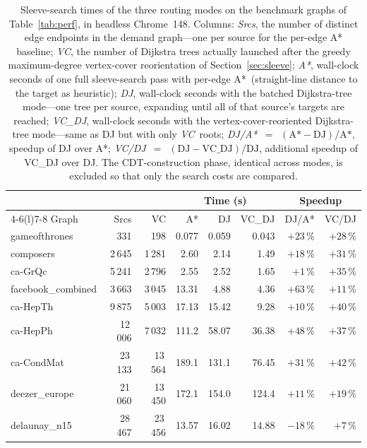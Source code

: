 \begin{table}[t]
  \centering
  \scriptsize
  \setlength{\tabcolsep}{4.5pt}
  \begin{tabular}{@{}lrrrrrrr@{}}
    \toprule
    & & & \multicolumn{3}{c}{Time (s)} & \multicolumn{2}{c}{Speedup} \\
    \cmidrule(lr){4-6}\cmidrule(l){7-8}
    Graph & Srcs & VC & A* & DJ & VC\_DJ & DJ/A* & VC/DJ \\
    \midrule
    gameofthrones      &     331 &     198 &   0.077 &   0.059 &   0.043 & $+23$\,\% & $+28$\,\% \\
    composers          &  2\,645 &  1\,281 &   2.60  &   2.14  &   1.49  & $+18$\,\% & $+31$\,\% \\
    ca-GrQc            &  5\,241 &  2\,796 &   2.55  &   2.52  &   1.65  &  $+1$\,\% & $+35$\,\% \\
    facebook\_combined &  3\,663 &  3\,045 &  13.31  &   4.88  &   4.36  & $+63$\,\% & $+11$\,\% \\
    ca-HepTh           &  9\,875 &  5\,003 &  17.13  &  15.42  &   9.28  & $+10$\,\% & $+40$\,\% \\
    ca-HepPh           & 12\,006 &  7\,032 & 111.2   &  58.07  &  36.38  & $+48$\,\% & $+37$\,\% \\
    ca-CondMat         & 23\,133 & 13\,564 & 189.1   & 131.1   &  76.45  & $+31$\,\% & $+42$\,\% \\
    deezer\_europe     & 21\,060 & 13\,450 & 172.1   & 154.0   & 124.4   & $+11$\,\% & $+19$\,\% \\
    delaunay\_n15      & 28\,467 & 23\,456 &  13.57  &  16.02  &  14.88  & $-18$\,\% &  $+7$\,\% \\
    \bottomrule
  \end{tabular}
  \caption{Sleeve-search times of the three routing modes on the
    benchmark graphs of Table~\ref{tab:perf}, in headless
    Chrome~148. Columns: \emph{Srcs}, the number of distinct edge
    endpoints in the demand graph---one per source for the per-edge
    A* baseline; \emph{VC}, the number of Dijkstra trees actually
    launched after the greedy maximum-degree vertex-cover
    reorientation of Section~\ref{sec:sleeve}; \emph{A*}, wall-clock
    seconds of one full sleeve-search pass with per-edge A*\
    (straight-line distance to the target as heuristic);
    \emph{DJ}, wall-clock seconds with the batched Dijkstra-tree
    mode---one tree per source, expanding until all of that source's
    targets are reached; \emph{VC\_DJ}, wall-clock seconds with the
    vertex-cover-reoriented Dijkstra-tree mode---same as DJ but with
    only \emph{VC}~roots; \emph{DJ/A*}~$=$~$(\text{A*}-\text{DJ})/\text{A*}$,
    speedup of DJ over A*; \emph{VC/DJ}~$=$~$(\text{DJ}-\text{VC\_DJ})/\text{DJ}$,
    additional speedup of VC\_DJ over DJ. The CDT-construction phase,
    identical across modes, is excluded so that only the search costs
    are compared.}
  \label{tab:routing-modes}
\end{table}

